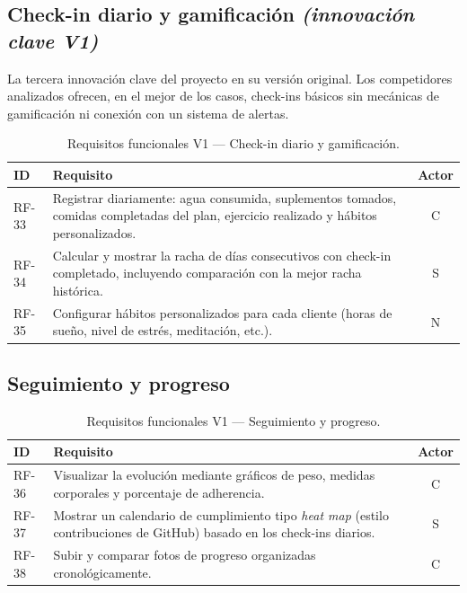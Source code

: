 \subsection{Check-in diario y gamificación \textnormal{\textit{(innovación clave V1)}}}

La tercera innovación clave del proyecto en su versión original. Los competidores analizados ofrecen, en el mejor de los casos, check-ins básicos sin mecánicas de gamificación ni conexión con un sistema de alertas.

\begin{table}[htbp]
\centering
\small
\begin{tabular}{|l|p{10.5cm}|c|}
\hline
\textbf{ID} & \textbf{Requisito} & \textbf{Actor} \\
\hline
RF-33 & Registrar diariamente: agua consumida, suplementos tomados, comidas completadas del plan, ejercicio realizado y hábitos personalizados. & C \\
\hline
RF-34 & Calcular y mostrar la racha de días consecutivos con check-in completado, incluyendo comparación con la mejor racha histórica. & S \\
\hline
RF-35 & Configurar hábitos personalizados para cada cliente (horas de sueño, nivel de estrés, meditación, etc.). & N \\
\hline
\end{tabular}
\caption{Requisitos funcionales V1 --- Check-in diario y gamificación.}
\label{tab:rf-checkin-v1}
\end{table}

\subsection{Seguimiento y progreso}

\begin{table}[htbp]
\centering
\small
\begin{tabular}{|l|p{10.5cm}|c|}
\hline
\textbf{ID} & \textbf{Requisito} & \textbf{Actor} \\
\hline
RF-36 & Visualizar la evolución mediante gráficos de peso, medidas corporales y porcentaje de adherencia. & C \\
\hline
RF-37 & Mostrar un calendario de cumplimiento tipo \textit{heat map} (estilo contribuciones de GitHub) basado en los check-ins diarios. & S \\
\hline
RF-38 & Subir y comparar fotos de progreso organizadas cronológicamente. & C \\
\hline
\end{tabular}
\caption{Requisitos funcionales V1 --- Seguimiento y progreso.}
\label{tab:rf-progreso-v1}
\end{table}

